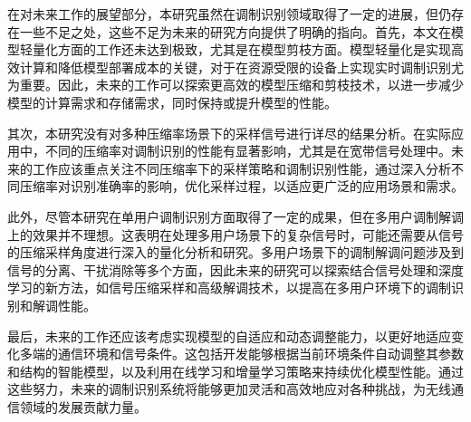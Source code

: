 在对未来工作的展望部分，本研究虽然在调制识别领域取得了一定的进展，但仍存在一些不足之处，这些不足为未来的研究方向提供了明确的指向。首先，本文在模型轻量化方面的工作还未达到极致，尤其是在模型剪枝方面。模型轻量化是实现高效计算和降低模型部署成本的关键，对于在资源受限的设备上实现实时调制识别尤为重要。因此，未来的工作可以探索更高效的模型压缩和剪枝技术，以进一步减少模型的计算需求和存储需求，同时保持或提升模型的性能。

其次，本研究没有对多种压缩率场景下的采样信号进行详尽的结果分析。在实际应用中，不同的压缩率对调制识别的性能有显著影响，尤其是在宽带信号处理中。未来的工作应该重点关注不同压缩率下的采样策略和调制识别性能，通过深入分析不同压缩率对识别准确率的影响，优化采样过程，以适应更广泛的应用场景和需求。

此外，尽管本研究在单用户调制识别方面取得了一定的成果，但在多用户调制解调上的效果并不理想。这表明在处理多用户场景下的复杂信号时，可能还需要从信号的压缩采样角度进行深入的量化分析和研究。多用户场景下的调制解调问题涉及到信号的分离、干扰消除等多个方面，因此未来的研究可以探索结合信号处理和深度学习的新方法，如信号压缩采样和高级解调技术，以提高在多用户环境下的调制识别和解调性能。

最后，未来的工作还应该考虑实现模型的自适应和动态调整能力，以更好地适应变化多端的通信环境和信号条件。这包括开发能够根据当前环境条件自动调整其参数和结构的智能模型，以及利用在线学习和增量学习策略来持续优化模型性能。通过这些努力，未来的调制识别系统将能够更加灵活和高效地应对各种挑战，为无线通信领域的发展贡献力量。